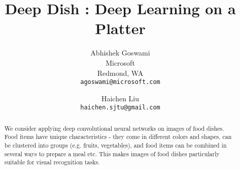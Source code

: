 \documentclass[10pt,twocolumn,letterpaper]{article}
\begin{document}
\title{Deep Dish : Deep Learning on a Platter}

\author{Abhishek Goswami\\
Microsoft\\
Redmond, WA\\
{\tt\small agoswami@microsoft.com}
\and
Haichen Liu\\
{\tt\small haichen.sjtu@gmail.com}
}

\maketitle

\begin{abstract}
	
	We consider applying deep convolutional neural networks on images of food dishes. Food items have unique characteristics - they come in different colors and shapes, can be clustered into groups (e.g. fruits, vegetables), and food items can be combined in several ways to prepare a meal etc. This makes images of food dishes particularly suitable for visual recognition tasks.
		
\end{abstract}








{\small


}
\end{document}
